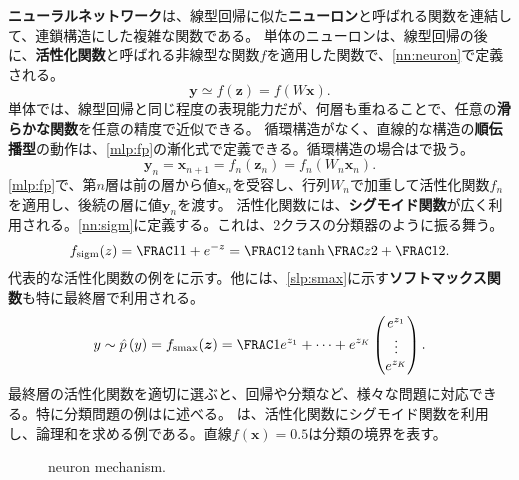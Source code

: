 \documentclass[10pt,a4paper]{book}
\begin{document}
\textbf{ニューラルネットワーク}は、線型回帰に似た\textbf{ニューロン}と呼ばれる関数を連結して、連鎖構造にした複雑な関数である。
単体のニューロンは、線型回帰の後に、\textbf{活性化関数}と呼ばれる非線型な関数$f$を適用した関数で、\eqref{nn:neuron}で定義される。
%
\begin{equation}
\label{eq:nn:neuron}
\bm{y} \simeq f(\bm{z}) = f(W\bm{x}).
\end{equation}
%
単体では、線型回帰と同じ程度の表現能力だが、何層も重ねることで、任意の\textbf{滑らかな関数}を任意の精度で近似できる。
循環構造がなく、直線的な構造の\textbf{順伝播型}の動作は、\eqref{mlp:fp}の漸化式で定義できる。循環構造の場合はで扱う。
%
\begin{equation}
\label{eq:mlp:fp}
\bm{y}_n = \bm{x}_{n+1} = f_n(\bm{z}_n) = f_n(W_n\bm{x}_n).
\end{equation}
%
\eqref{mlp:fp}で、第$n$層は前の層から値$\bm{x}_n$を受容し、行列$W_n$で加重して活性化関数$f_n$を適用し、後続の層に値$\bm{y}_n$を渡す。
活性化関数には、\textbf{シグモイド関数}が広く利用される。\eqref{nn:sigm}に定義する。これは、2クラスの分類器のように振る舞う。
%
\begin{equation}
\label{eq:nn:sigm}
\sigm(z) = \frac{1}{1 + e^{-z}} = \frac{1}{2}\tanh\frac{z}{2} + \frac{1}{2}.
\end{equation}
%
代表的な活性化関数の例をに示す。他には、\eqref{slp:smax}に示す\textbf{ソフトマックス関数}も特に最終層で利用される。
%
\begin{equation}
\label{eq:slp:smax}
y \sim \hatprob{y} = \smax(\bm{z}) =
\frac{1}{e^{z_1}+\cdots+e^{z_K}}
\begin{pmatrix}
e^{z_1}\\
\vdots\\
e^{z_K}
\end{pmatrix}.
\end{equation}
%
最終層の活性化関数を適切に選ぶと、回帰や分類など、様々な問題に対応できる。特に分類問題の例はに述べる。
は、活性化関数にシグモイド関数を利用し、論理和を求める例である。直線$f(\bm{x})=0.5$は分類の境界を表す。

\begin{figure}[h]
\centering
{}
\caption{neuron mechanism.\label{fig:slp}}
\end{figure}
\end{document}
